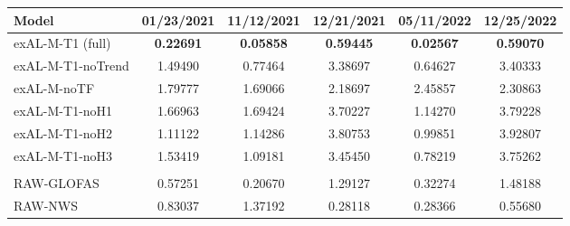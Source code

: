 \begin{center}
\scriptsize
\setlength{\tabcolsep}{4pt}
\begin{tabular}{>{\ttfamily}l c c c c c}
\toprule
Model & 01/23/2021 & 11/12/2021 & 12/21/2021 & 05/11/2022 & 12/25/2022 \\
\midrule
exAL-M-T1 (full) & \textbf{0.22691} & \textbf{0.05858} & \textbf{0.59445} & \textbf{0.02567} & \textbf{0.59070} \\
exAL-M-T1-noTrend & 1.49490 & 0.77464 & 3.38697 & 0.64627 & 3.40333 \\
exAL-M-noTF & 1.79777 & 1.69066 & 2.18697 & 2.45857 & 2.30863 \\
exAL-M-T1-noH1 & 1.66963 & 1.69424 & 3.70227 & 1.14270 & 3.79228 \\
exAL-M-T1-noH2 & 1.11122 & 1.14286 & 3.80753 & 0.99851 & 3.92807 \\
exAL-M-T1-noH3 & 1.53419 & 1.09181 & 3.45450 & 0.78219 & 3.75262 \\
\addlinespace[2pt]
\multicolumn{6}{l}{\textit{Raw forecast products (reference only)}} \\
RAW-GLOFAS & 0.57251 & 0.20670 & 1.29127 & 0.32274 & 1.48188 \\
RAW-NWS & 0.83037 & 1.37192 & 0.28118 & 0.28366 & 0.55680 \\
\bottomrule
\end{tabular}
\end{center}
